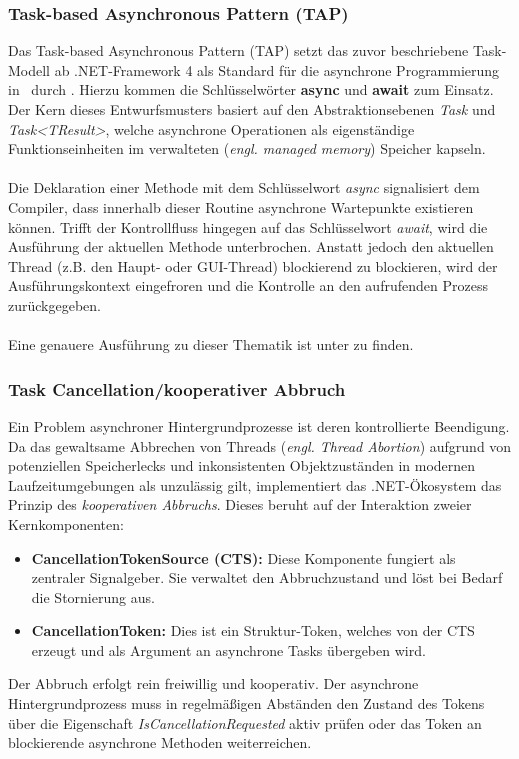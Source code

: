 \subsubsection{Task-based Asynchronous Pattern (TAP)}
\label{kap:Task-based Asynchronous Pattern (TAP)}
Das Task-based Asynchronous Pattern (TAP) setzt das zuvor beschriebene Task-Modell ab .NET-Framework 4 als Standard für die asynchrone Programmierung in \csharp\ durch \cite{asynchroneMuster}. Hierzu kommen die Schlüsselwörter \textbf{async} und \textbf{await} zum Einsatz. Der Kern dieses Entwurfsmusters basiert auf den Abstraktionsebenen \textit{Task} und \textit{Task<TResult>}, welche asynchrone Operationen als eigenständige Funktionseinheiten im verwalteten (\textit{engl. managed memory}) Speicher kapseln.\\
\\Die Deklaration einer Methode mit dem Schlüsselwort \textit{async} signalisiert dem Compiler, dass innerhalb dieser Routine asynchrone Wartepunkte existieren können. Trifft der Kontrollfluss hingegen auf das Schlüsselwort \textit{await}, wird die Ausführung der aktuellen Methode unterbrochen. Anstatt jedoch den aktuellen Thread (z.B. den Haupt- oder GUI-Thread) blockierend zu blockieren, wird der Ausführungskontext eingefroren und die Kontrolle an den aufrufenden Prozess zurückgegeben.\\
\\Eine genauere Ausführung zu dieser Thematik ist unter \cite{TAP} zu finden.

\subsubsection{Task Cancellation/kooperativer Abbruch}
\label{kap:Task Cancellation/kooperativer Abbruch}
Ein Problem asynchroner Hintergrundprozesse ist deren kontrollierte Beendigung. Da das gewaltsame Abbrechen von Threads (\textit{engl. Thread Abortion}) aufgrund von potenziellen Speicherlecks und inkonsistenten Objektzuständen in modernen Laufzeitumgebungen als unzulässig gilt, implementiert das .NET-Ökosystem das Prinzip des \textit{kooperativen Abbruchs}.
Dieses beruht auf der Interaktion zweier Kernkomponenten:
\begin{itemize}
	\item \textbf{CancellationTokenSource (CTS):} Diese Komponente fungiert als zentraler Signalgeber. Sie verwaltet den Abbruchzustand und löst bei Bedarf die Stornierung aus.
	\item \textbf{CancellationToken:} Dies ist ein Struktur-Token, welches von der CTS erzeugt und als Argument an asynchrone Tasks übergeben wird.
\end{itemize}
 Der Abbruch erfolgt rein freiwillig und kooperativ. Der asynchrone Hintergrundprozess muss in regelmäßigen Abständen den Zustand des Tokens über die Eigenschaft \textit{IsCancellationRequested} aktiv prüfen oder das Token an blockierende asynchrone Methoden weiterreichen. 

